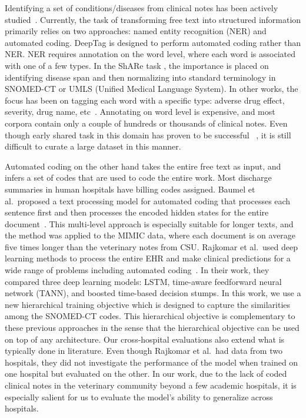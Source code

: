 \documentclass{article}[11pt,oneside]
\begin{document}
Identifying a set of conditions/diseases from clinical notes has been actively studied~\cite{demner2016aspiring,lipton2015learning}. Currently, the task of transforming free text into structured information primarily relies on two approaches: named entity recognition (NER) and automated coding. DeepTag is designed to perform automated coding rather than NER. NER requires annotation on the word level, where each word is associated with one of a few types. In the ShARe task \cite{pradhan2014evaluating}, the importance is placed on identifying disease span and then normalizing into standard terminology in SNOMED-CT or UMLS (Unified Medical Language System). In other works, the focus has been on tagging each word with a specific type: adverse drug effect, severity, drug name, etc~\cite{jagannatha2016bidirectional}. Annotating on word level is expensive, and most corpora contain only a couple of hundreds or thousands of clinical notes. Even though early shared task in this domain has proven to be successful  ~\cite{pradhan2014semeval,elhadad2015semeval}, it is still difficult to curate a large dataset in this manner.

Automated coding on the other hand takes the entire free text as input, and infers a set of codes that are used to code the entire work. Most discharge summaries in human hospitals have billing codes assigned. Baumel et al.~proposed a text processing model for automated coding that processes each sentence first and then processes the encoded hidden states for the entire document~\cite{baumel2017multi}. This multi-level approach is especially suitable for longer texts, and the method was applied to the MIMIC data, where each document is on average five times longer than the veterinary notes from CSU. Rajkomar et al.~used deep learning methods to process the entire EHR and make clinical predictions for a wide range of problems including automated coding~\cite{rajkomar2018scalable}. In their work, they compared three deep learning models: LSTM, time-aware feedforward neural network (TANN), and boosted time-based decision stumps. In this work, we use a new hierarchical training objective which is designed to capture the similarities among the SNOMED-CT codes. This hierarchical objective is complementary to these previous approaches in the sense that the hierarchical objective can be used on top of any architecture. Our cross-hospital evaluations also extend what is typically done in literature. Even though Rajkomar et al.~had data from two hospitals, they did not investigate the performance of the model when trained on one hospital but evaluated on the other. In our work, due to the lack of coded clinical notes in the veterinary community beyond a few academic hospitals, it is especially salient for us to evaluate the model’s ability to generalize across hospitals.
\end{document}
